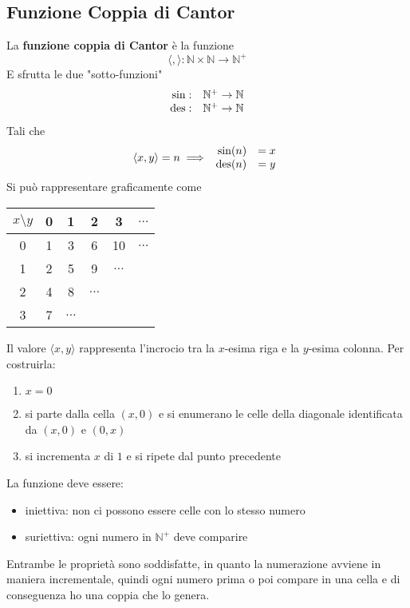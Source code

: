 \subsection{Funzione Coppia di Cantor}
La \textbf{funzione coppia di Cantor} è la funzione
$$ \langle , \rangle: \mathbb{N} \times \mathbb{N} \rightarrow \mathbb{N}^+ $$
E sfrutta le due "sotto-funzioni" 
$$
\begin{array}{r c}
	\sin: & \mathbb{N}^+ \rightarrow \mathbb{N} \\
	\operatorname{des}: & \mathbb{N}^+ \rightarrow \mathbb{N}
\end{array}
$$
Tali che 
$$ \langle x,y \rangle = n \implies \begin{array}{r c}
	\sin (n) & = x \\
	\operatorname{des} (n) & = y
\end{array}$$
Si può rappresentare graficamente come

\begin{center}
	\begin{minipage}[h]{0.45\textwidth}
		{\renewcommand{\arraystretch}{1.3}
			\begin{tabular}{c | c c c c c}
				$x\setminus y$ & 0 & 1 & 2 & 3 & $\dots$ \\ 
				\hline
				0 & 1 & 3 & 6 & 10 & $\dots$ \\
				1 & 2 & 5 & 9 & $\dots$ & \\
				2 & 4 & 8 & $\dots$ && \\
				3 & 7 & $\dots$ &&& \\
		\end{tabular}}
	\end{minipage}
	\hfill 
	\begin{minipage}[h]{0.45\textwidth}
		
	\end{minipage}
\end{center}

Il valore $\langle x,y \rangle$ rappresenta l'incrocio tra la $x$-esima riga e la $y$-esima colonna. Per costruirla:
\begin{enumerate}
	\item $x = 0$
	\item si parte dalla cella $(x,0)$ e si enumerano le celle della diagonale identificata da $(x,0)$ e $(0,x)$
	\item si incrementa $x$ di $1$ e si ripete dal punto precedente
\end{enumerate}

La funzione deve essere: 
\begin{itemize}
	\item iniettiva: non ci possono essere celle con lo stesso numero
	\item suriettiva: ogni numero in $\mathbb{N}^+$ deve comparire
\end{itemize}
Entrambe le proprietà sono soddisfatte, in quanto la numerazione avviene in maniera incrementale, quindi ogni numero prima o poi compare in una cella e di conseguenza ho una coppia che lo genera.\\


